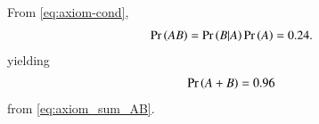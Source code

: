 From \eqref{eq:axiom-cond},
\begin{align}
{\ensuremath{\Pr\left(AB\right)}}=\Pr\left(B|A\right){\Pr\left(A\right)}
           = 0.24.
\end{align}
yielding
\begin{align}
\Pr\left(A + B\right) = 0.96
\end{align}
from 
\eqref{eq:axiom_sum_AB}.
